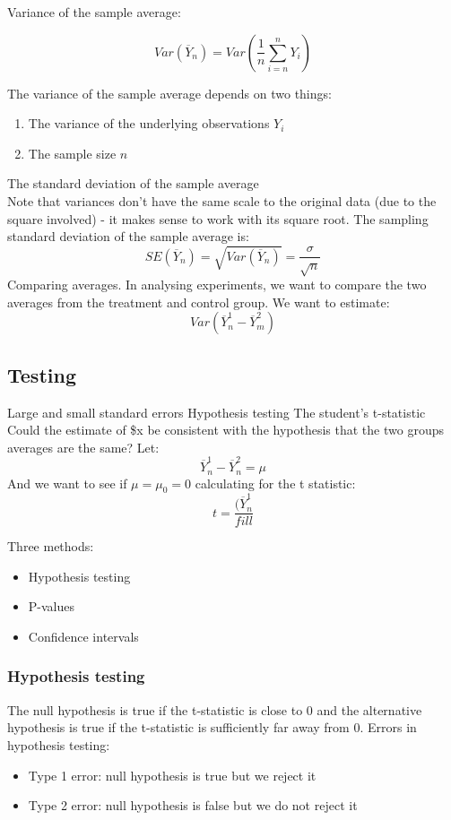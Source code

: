 \documentclass[12pt, letterpaper]{article}
\begin{document}
{Variance of the sample average:
\begin{center}
	$$Var(\overline{Y}_n) = Var( \frac{1}{n	} \sum_{i=n}^{n} Y_i)$$
\end{center}
The variance of the sample average depends on two things:
\begin{enumerate}
	\item The variance of the underlying observations $Y_i$
	\item The sample size $n$
\end{enumerate}
The standard deviation of the sample average\\
Note that variances don't have the same scale to the original data (due to the square involved) - it makes sense to work with its square root. The sampling standard deviation of the sample average is:
$$SE(\overline{Y}_n) = \sqrt{Var(\overline{Y}_n)} = \frac{\sigma}{\sqrt{n}}$$
Comparing averages. In analysing experiments, we want to compare the two averages from the treatment and control group. We want to estimate:
$$Var(\overline{Y}_n^1 - \overline{Y}_m^2)$$

\subsection{Testing}
Large and small standard errors
Hypothesis testing
The student's t-statistic
Could the estimate of \$x be consistent with the hypothesis that the two groups averages are the same? Let:
$$\overline{Y}_n^1 - \overline{Y}_n^2 = \mu$$
And we want to see if $\mu = \mu_0 = 0$ calculating for the t statistic:
$$t=\frac{(\overline{Y}_n^1}{fill}$$

Three methods:
\begin{itemize}
	\item Hypothesis testing
	\item P-values
	\item Confidence intervals
\end{itemize}

\subsubsection{Hypothesis testing}
The null hypothesis is true if the t-statistic is close to 0 and the alternative hypothesis is true if the t-statistic is sufficiently far away from 0.
Errors in hypothesis testing:
\begin{itemize}
	\item Type 1 error: null hypothesis is true but we reject it
	\item Type 2 error: null hypothesis is false but we do not reject it
\end{itemize}

}
\end{document}

